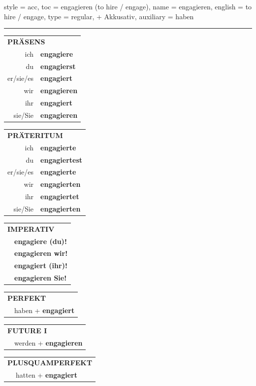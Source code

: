 \begin{verbentry}{
  style = {acc},
  toc = {engagieren (to hire / engage)},
  name = {engagieren},
  english = {to hire / engage},
  type = {regular, + Akkusativ},
  auxiliary = {haben}
}


\vspace{5pt}
\hrule
\vspace{5pt}

\begin{tabular}{rl}
\multicolumn{2}{l}{\textbf{PRÄSENS}}\\
ich & \textbf{engagiere}\\
du & \textbf{engagierst}\\
er/sie/es & \textbf{engagiert}\\
wir & \textbf{engagieren}\\
ihr & \textbf{engagiert}\\
sie/Sie & \textbf{engagieren}\\
\end{tabular}
\hfill
\begin{tabular}{rl}
\multicolumn{2}{l}{\textbf{PRÄTERITUM}}\\
ich & \textbf{engagierte}\\
du & \textbf{engagiertest}\\
er/sie/es & \textbf{engagierte}\\
wir & \textbf{engagierten}\\
ihr & \textbf{engagiertet}\\
sie/Sie & \textbf{engagierten}\\
\end{tabular}
\hfill
\begin{tabular}{rl}
\multicolumn{2}{l}{\textbf{IMPERATIV}}\\
& \textbf{engagiere (du)!}\\
& \textbf{engagieren wir!}\\
& \textbf{engagiert (ihr)!}\\
& \textbf{engagieren Sie!}\\
\end{tabular}

\vspace{10pt}

\begin{tabular}{rl}
\multicolumn{2}{l}{\textbf{PERFEKT}}\\
& haben + \textbf{engagiert}\\
\end{tabular}
\hfill
\begin{tabular}{rl}
\multicolumn{2}{l}{\textbf{FUTURE I}}\\
& werden + \textbf{engagieren}\\
\end{tabular}
\hfill
\begin{tabular}{rl}
\multicolumn{2}{l}{\textbf{PLUSQUAMPERFEKT}}\\
& hatten + \textbf{engagiert}\\
\end{tabular}


\end{verbentry}
